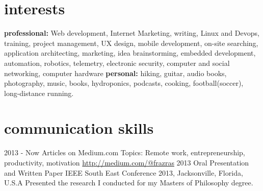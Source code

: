 \documentclass[]{friggeri-cv} %
\begin{document}

\section{interests}

\textbf{professional:} Web development, Internet Marketing, writing, Linux and Devops, training, project management, UX design, mobile development, on-site searching, application architecting, marketing, idea brainstorming, embedded development, automation, robotics, telemetry, electronic security, computer and social networking, computer hardware
\textbf{personal:} hiking, guitar, audio books, photography, music, books, hydroponics, podcasts, cooking, football(soccer), long-distance running.




\newpage
\section{communication skills}

\begin{entrylist}

\entry
{2013 - Now}
{Articles on Medium.com}
{Topics: Remote work, entrepreneurship, productivity, motivation}
{\href{http://medium.com/@frazras}{http://medium.com/@frazras}}
\entry
{2013}
{Oral Presentation and Written Paper}
{IEEE South East Conference 2013, Jacksonville, Florida, U.S.A}
{Presented the research I conducted for my Masters of Philosophy degree.}
\end{entrylist}
\end{document}
